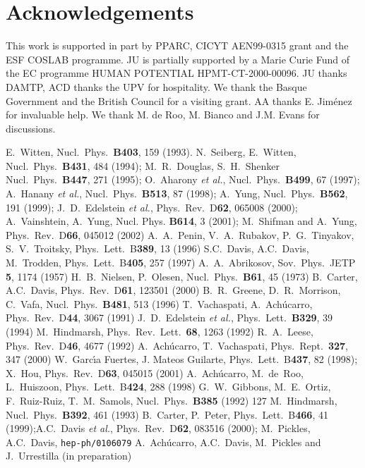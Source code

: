 \documentclass[a4paper,aps,prd,superscriptaddress,floats]{revtex4}
\begin{document}
\section{Acknowledgements}
This work is supported in part by PPARC, CICYT AEN99-0315 grant 
and the ESF COSLAB programme. JU is partially supported by a Marie Curie Fund 
of the EC programme HUMAN POTENTIAL HPMT-CT-2000-00096.
JU thanks DAMTP, ACD thanks the UPV  for hospitality. 
We thank the Basque Government and the British Council 
for a visiting grant. AA thanks E. Jim\'enez for 
invaluable help. We thank M. de Roo, M. Bianco and J.M. Evans
for discussions.

\begin{thebibliography}{}
 E.~Witten, Nucl.~Phys.~{\bf B403}, 159 (1993). 
 N.~Seiberg, E.~Witten, Nucl.~Phys.~{\bf B431}, 484 (1994);
 M.~R.~Douglas, S.~H.~Shenker Nucl.~Phys.~{\bf B447}, 271 (1995); 
O.~Aharony {\slshape et al.}, Nucl.~Phys.~{\bf B499}, 67 (1997);
A.~Hanany {\slshape et al.}, Nucl.~Phys.~{\bf B513}, 87 (1998);
A.~Yung, Nucl.~Phys.~{\bf B562}, 191 (1999);
J.~D.~Edelstein {\slshape et al.}, Phys.~Rev.~D{\bf 62}, 065008 (2000);
A.~Vainshtein, A.~Yung, Nucl. Phys. {\bf B614}, 3 (2001); M.~Shifman and A.~Yung, Phys.~Rev.~D{\bf 66}, 045012 (2002)
A.~A.~Penin, V.~A.~Rubakov, P.~G.~Tinyakov, S.~V.~Troitsky, 
Phys.~Lett.~B{\bf 389}, 13 (1996)
 S.C.~Davis, A.C.~Davis, M.~Trodden, Phys.~Lett.~B{\bf 405}, 257  (1997) 
A.~A.~Abrikosov, Sov.~Phys.~JETP {\bf 5}, 1174 (1957) 
H.~B.~Nielsen, P.~Olesen, Nucl.~Phys.~{\bf B61}, 45 (1973)
B.~Carter, A.C.~Davis, Phys.~Rev.~D{\bf 61}, 123501 (2000) 
B.~R.~Greene, D.~R.~Morrison, C.~Vafa, 
        Nucl.~Phys.~{\bf B481}, 513 (1996) 
T.~Vachaspati, A.~Ach\'{u}carro, Phys.~Rev.~D{\bf 44}, 3067
        (1991)
J.~D.~Edelstein {\slshape et al.}, Phys.~Lett.~{\bf B329}, 39 (1994)
M.~Hindmarsh, Phys.~Rev.~Lett.~{\bf 68}, 1263 (1992)
R.~A.~Leese,  Phys.~Rev.~D{\bf 46}, 4677 (1992)
 A.~Ach\'ucarro, T.~Vachaspati, Phys.~Rept.~{\bf 327}, 347 (2000)
 W.~Garc\'\i a Fuertes, J. Mateos Guilarte, Phys.~Lett.~B{\bf 437}, 82 (1998);
X.~Hou, Phys.~Rev.~D{\bf 63}, 045015 (2001)
A.~Ach\'ucarro, M.~de~Roo, L.~Huiszoon, Phys.~Lett.~B{\bf 424}, 288 (1998)
G.~W.~Gibbons, M.~E.~Ortiz, F.~Ruiz-Ruiz, T.~M.~Samols, 
        Nucl.~Phys.~{\bf B385} (1992) 127
M.~Hindmarsh, Nucl.~Phys.~{\bf B392}, 461 (1993) 
B.~Carter, P.~Peter, Phys.~Lett.~B{\bf 466},
41 (1999);A.C.~Davis {\slshape et al.}, Phys.~Rev.~D{\bf 62}, 083516 (2000); 
M.~Pickles, A.C.~Davis, {\tt hep-ph/0106079}
 A.~Ach\'ucarro, A.C.~Davis, M.~Pickles and J.~Urrestilla (in preparation)
\end{thebibliography}
\end{document}
